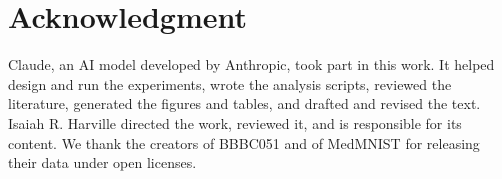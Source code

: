 \documentclass[conference]{IEEEtran}
\newif\ifanycitation
\begin{document}
\section*{Acknowledgment}

Claude, an AI model developed by Anthropic, took part in this work. It helped design and
run the experiments, wrote the analysis scripts, reviewed the literature, generated the
figures and tables, and drafted and revised the text. Isaiah R. Harville directed the
work, reviewed it, and is responsible for its content. We thank the creators of BBBC051
and of MedMNIST for releasing their data under open licenses.

\ifanycitation


\fi
\end{document}
